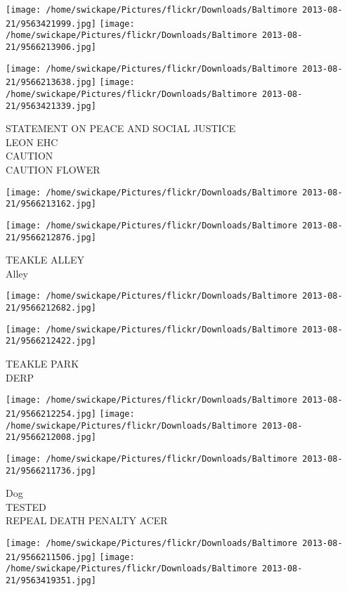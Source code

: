 \documentclass[10pt,letterpaper]{article}
\begin{document}
\texttt{[image: /home/swickape/Pictures/flickr/Downloads/Baltimore 2013-08-21/9563421999.jpg]}
\texttt{[image: /home/swickape/Pictures/flickr/Downloads/Baltimore 2013-08-21/9566213906.jpg]}

\texttt{[image: /home/swickape/Pictures/flickr/Downloads/Baltimore 2013-08-21/9566213638.jpg]}
\texttt{[image: /home/swickape/Pictures/flickr/Downloads/Baltimore 2013-08-21/9563421339.jpg]}

STATEMENT ON PEACE AND SOCIAL JUSTICE\\
LEON EHC\\
CAUTION\\
CAUTION FLOWER
\pagebreak

\texttt{[image: /home/swickape/Pictures/flickr/Downloads/Baltimore 2013-08-21/9566213162.jpg]}

\vspace{0.25in}
\texttt{[image: /home/swickape/Pictures/flickr/Downloads/Baltimore 2013-08-21/9566212876.jpg]}

TEAKLE ALLEY\\
Alley
\pagebreak

\texttt{[image: /home/swickape/Pictures/flickr/Downloads/Baltimore 2013-08-21/9566212682.jpg]}

\vspace{0.25in}
\texttt{[image: /home/swickape/Pictures/flickr/Downloads/Baltimore 2013-08-21/9566212422.jpg]}

TEAKLE PARK\\
DERP
\pagebreak

\texttt{[image: /home/swickape/Pictures/flickr/Downloads/Baltimore 2013-08-21/9566212254.jpg]}
\texttt{[image: /home/swickape/Pictures/flickr/Downloads/Baltimore 2013-08-21/9566212008.jpg]}

\vspace{0.25in}
\texttt{[image: /home/swickape/Pictures/flickr/Downloads/Baltimore 2013-08-21/9566211736.jpg]}

Dog\\
TESTED\\
REPEAL DEATH PENALTY ACER
\pagebreak

\texttt{[image: /home/swickape/Pictures/flickr/Downloads/Baltimore 2013-08-21/9566211506.jpg]}
\texttt{[image: /home/swickape/Pictures/flickr/Downloads/Baltimore 2013-08-21/9563419351.jpg]}
\end{document}
